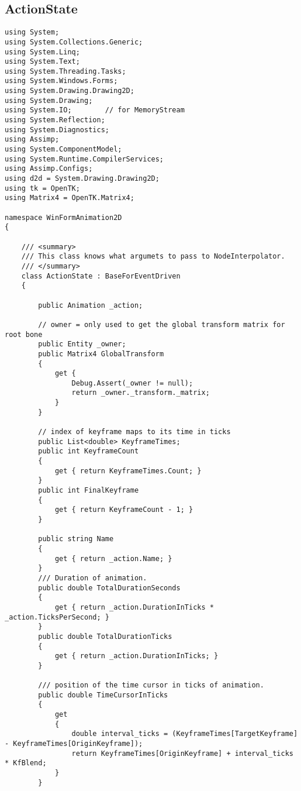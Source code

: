 ﻿\begin{scriptsize}

\subsection{ActionState}

\begin{verbatim}
using System;
using System.Collections.Generic;
using System.Linq;
using System.Text;
using System.Threading.Tasks;
using System.Windows.Forms;
using System.Drawing.Drawing2D;
using System.Drawing;
using System.IO;        // for MemoryStream
using System.Reflection;
using System.Diagnostics;
using Assimp;
using System.ComponentModel;
using System.Runtime.CompilerServices;
using Assimp.Configs;
using d2d = System.Drawing.Drawing2D;
using tk = OpenTK;
using Matrix4 = OpenTK.Matrix4;

namespace WinFormAnimation2D
{

    /// <summary>
    /// This class knows what argumets to pass to NodeInterpolator.
    /// </summary>
    class ActionState : BaseForEventDriven
    {

        public Animation _action;

        // owner = only used to get the global transform matrix for root bone
        public Entity _owner;
        public Matrix4 GlobalTransform
        {
            get {
                Debug.Assert(_owner != null);
                return _owner._transform._matrix;
            }
        }

        // index of keyframe maps to its time in ticks
        public List<double> KeyframeTimes;
        public int KeyframeCount
        {
            get { return KeyframeTimes.Count; }
        }
        public int FinalKeyframe
        {
            get { return KeyframeCount - 1; }
        }

        public string Name
        {
            get { return _action.Name; }
        }
        /// Duration of animation.
        public double TotalDurationSeconds
        {
            get { return _action.DurationInTicks * _action.TicksPerSecond; }
        }
        public double TotalDurationTicks
        {
            get { return _action.DurationInTicks; }
        }

        /// position of the time cursor in ticks of animation.
        public double TimeCursorInTicks
        {
            get
            {
                double interval_ticks = (KeyframeTimes[TargetKeyframe] - KeyframeTimes[OriginKeyframe]);
                return KeyframeTimes[OriginKeyframe] + interval_ticks * KfBlend;
            }
        }


\end{verbatim}
\end{scriptsize}
